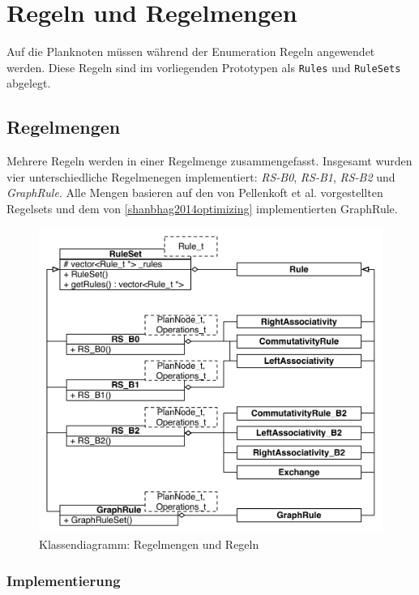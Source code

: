 \section{Regeln und Regelmengen}
Auf die Planknoten müssen während der Enumeration Regeln angewendet werden. Diese Regeln sind im vorliegenden Prototypen als \texttt{Rules} und \texttt{RuleSets} abgelegt.

\subsection{Regelmengen}
Mehrere Regeln werden in einer Regelmenge zusammengefasst.
Insgesamt wurden vier unterschiedliche Regelmenegen implementiert: \textit{RS-B0}, \textit{RS-B1}, \textit{RS-B2} und \textit{GraphRule}.
Alle Mengen basieren auf den von Pellenkoft et al. vorgestellten Regelsets und dem von \ref{shanbhag2014optimizing} implementierten GraphRule.

\begin{figure}[ht]
  \centering
  \includegraphics[width=\textwidth]{04_Implementierung/00_media/RuleSets.pdf}
  \caption{Klassendiagramm: Regelmengen und Regeln}
  \label{RuleSetClass}
\end{figure}

\subsubsection{Implementierung}
\label{sec:RuleImplementation}

